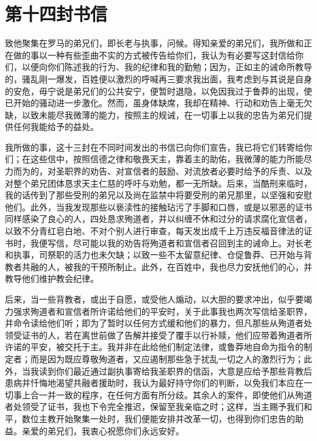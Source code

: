 
\section{第十四封书信}

\par

\par

致他聚集在罗马的弟兄们，即长老与执事，问候。得知亲爱的弟兄们，我所做和正在做的事以一种有些歪曲不实的方式被传告给你们，我认为有必要写这封信给你们，以便向你们陈述我的行为、我的纪律和我的勤勉；因为，正如主的诫命所教导的，骚乱刚一爆发，百姓便以激烈的呼喊再三要求我出面，我考虑到与其说是自身的安危，毋宁说是弟兄们的公共安宁，便暂时退隐，以免因我过于鲁莽的出现，使已开始的骚动进一步激化。然而，虽身体缺席，我却在精神、行动和劝告上毫无欠缺，以致未能尽我微薄的能力，按照主的规诫，在一切事上以我的忠告为弟兄们提供任何我能给予的益处。\par

我所做的事，这十三封在不同时间发出的书信已向你们宣告，我已将它们转寄给你们；在这些信中，按照信德之律和敬畏天主，靠着主的助佑，我微薄的能力所能尽力而为的，对圣职界的劝告、对宣信者的鼓励、对流放者必要时给予的斥责、以及对整个弟兄团体恳求天主仁慈的呼吁与劝勉，都一无所缺。后来，当酷刑来临时，我的话传到了那些受刑的弟兄以及尚在监禁中将要受刑的弟兄那里，以坚强和安慰他们。此外，当我发现那些以亵渎性的接触玷污了手脚和口唇，或是以邪恶的证书同样感染了良心的人，四处恳求殉道者，并以纠缠不休和过分的请求腐化宣信者，以致不分青红皂白地、不对个别人进行审查，每天发出成千上万违反福音律法的证书时，我便写信，尽可能以我的劝告将殉道者和宣信者召回到主的诫命上。对长老和执事，司祭职的活力也未欠缺；以致一些不太留意纪律、仓促鲁莽、已开始与背教者共融的人，被我的干预所制止。此外，在百姓中，我也尽力安抚他们的心，并教导他们维护教会纪律。\par

后来，当一些背教者，或出于自愿，或受他人煽动，以大胆的要求冲出，似乎要竭力强求殉道者和宣信者所许诺给他们的平安时，关于此事我也两次写信给圣职界，并命令读给他们听；即为了暂时以任何方式缓和他们的暴力，但凡那些从殉道者处领受证书的人，若在离世前做了告解并接受了覆手以行补赎，他们应带着殉道者所许诺的平安，被交托于主。我并非在此给他们制定法律，或鲁莽地自命为指令的制定者；而是因为既应尊敬殉道者，又应遏制那些急于扰乱一切之人的激烈行为；此外，当我读到你们最近通过副执事寄给我圣职界的信函，大意是应给予那些背教后患病并忏悔地渴望共融者援助时，我认为最好持守你们的判断，以免我们本应在一切事上合一并一致的程序，在任何方面有所分歧。其余人的案件，即使他们从殉道者处领受了证书，我也下令完全推迟，保留至我亲临之时；这样，当主赐予我们和平，数位主教开始聚集一处时，我们便能安排并改革一切，也得到你们忠告的助益。亲爱的弟兄们，我衷心祝愿你们永远安好。\par

